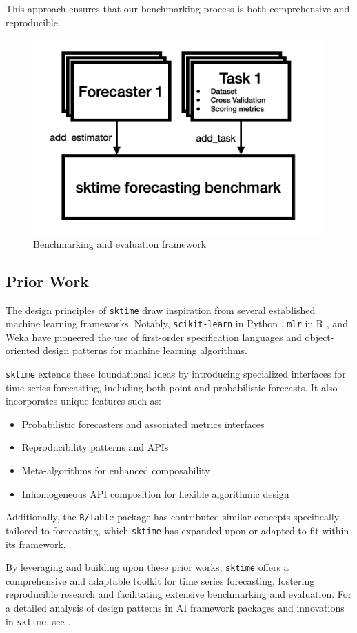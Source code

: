 This approach ensures that our benchmarking process is both comprehensive and reproducible. 

\begin{figure}
    \centering
    \includegraphics[width=.5\textwidth]{Figures/evaluationFramework.png}
    \caption{Benchmarking and evaluation framework}
    \label{fig:enter-label}
\end{figure}

\subsection{Prior Work}
The design principles of \texttt{sktime} draw inspiration from several established machine learning frameworks. Notably, \texttt{scikit-learn} in Python \cite{pedregosa2011scikit}, \texttt{mlr} in R \cite{bischl2016mlr}, and Weka \cite{hall2009weka} have pioneered the use of first-order specification languages and object-oriented design patterns for machine learning algorithms. 

\texttt{sktime} extends these foundational ideas by introducing specialized interfaces for time series forecasting, including both point and probabilistic forecasts. It also incorporates unique features such as:
\begin{itemize}
    \item Probabilistic forecasters and associated metrics interfaces
    \item Reproducibility patterns and APIs
    \item Meta-algorithms for enhanced composability
    \item Inhomogeneous API composition for flexible algorithmic design
\end{itemize}

Additionally, the \texttt{R/fable} package \cite{hyndman2020package} has contributed similar concepts specifically tailored to forecasting, which \texttt{sktime} has expanded upon or adapted to fit within its framework.

By leveraging and building upon these prior works, \texttt{sktime} offers a comprehensive and adaptable toolkit for time series forecasting, fostering reproducible research and facilitating extensive benchmarking and evaluation.
For a detailed analysis of design patterns in AI framework packages and innovations in \texttt{sktime}, see \cite{kiraly2021designing}.

